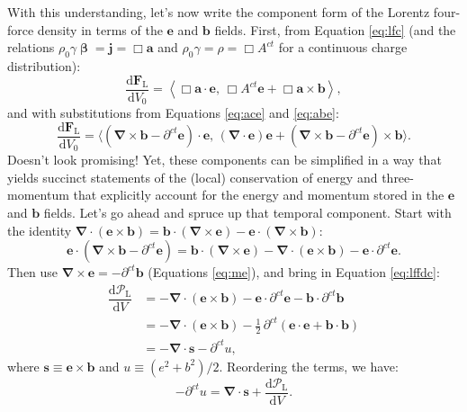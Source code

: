 \documentclass[12pt]{article}
\renewcommand{\vv}[1]{\mathbf{#1}}
\newcommand{\dd}[1]{\mathrm{d}#1}
\newcommand{\vvbeta}{\bm{\upbeta}}
\newcommand{\del}{\boldsymbol{\nabla}}
\begin{document}
With this understanding, let's now write the component form of the Lorentz four-force density in terms of the $\vv e$ and $\vv b$ fields. First, from Equation \ref{eq:lfc} (and the relations $\rho_0 \gamma \vvbeta = \vv j = \Box \vv a$ and $\rho_0 \gamma = \rho = \Box A^{ct}$ for a continuous charge distribution):
\begin{equation*}
\dfrac{\dd \vv F_{\mathrm{L}}}{\dd V_0} = \left \langle \Box \vv a \cdot \vv e, \, \Box A^{ct} \vv e + \Box \vv a \times \vv b \right \rangle ,
\end{equation*}
and with substitutions from Equations \ref{eq:ace} and \ref{eq:abe}:
\begin{equation}\label{eq:lffdc2}
\dfrac{\dd \vv F_{\mathrm{L}}}{\dd V_0} = \Big \langle \left( \del \times \vv b - \partial^{ct} \vv e \right) \cdot \vv e , \, \left( \del \cdot \vv e \right) \vv e + \left( \del \times \vv b - \partial^{ct} \vv e \right) \times \vv b \Big \rangle .
\end{equation}
Doesn't look promising! Yet, these components can be simplified in a way that yields succinct statements of the (local) conservation of energy and three-momentum that explicitly account for the energy and momentum stored in the $\vv e$ and $\vv b$ fields. Let's go ahead and spruce up that temporal component. Start with the identity $\del \cdot (\vv e \times \vv b) = \vv b \cdot (\del \times \vv e) - \vv e \cdot (\del \times \vv b)$:
\begin{equation*}
\vv e \cdot \left( \del \times \vv b - \partial^{ct} \vv e \right) = \vv b \cdot \left( \del \times \vv e \right) - \del \cdot \left( \vv e \times \vv b \right) - \vv e \cdot \partial^{ct} \vv e .
\end{equation*}
Then use $\del \times \vv e = - \partial^{ct} \vv b$ (Equations \ref{eq:me}), and bring in Equation \ref{eq:lffdc}:
\begin{equation*}
\begin{split}
\dfrac{\dd \mathcal{P}_{\textrm{L}}}{\dd V} &= - \del \cdot \left( \vv e \times \vv b \right) - \vv e \cdot \partial^{ct} \vv e - \vv b \cdot \partial^{ct} \vv b  \\
&= - \del \cdot \left( \vv e \times \vv b \right) - \frac{1}{2} \, \partial^{ct} \left( \vv e \cdot \vv e + \vv b \cdot \vv b \right) \\[2pt]
&= - \del \cdot \vv s - \partial^{ct} u ,
\end{split}
\end{equation*}
where $\vv s \equiv \vv e \times \vv b$ and $u \equiv (e^2 + b^2)/2$. Reordering the terms, we have:
\begin{equation}\label{eq:py}
- \partial^{ct} u =  \del \cdot \vv s + \dfrac{\dd \mathcal{P}_{\textrm{L}}}{\dd V}.
\end{equation}
\end{document}
